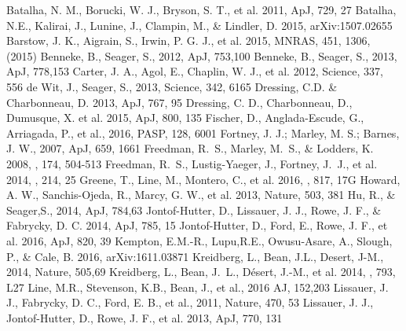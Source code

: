 \documentclass[iop]{emulateapj}
\begin{document}
\begin{thebibliography}{}
 Batalha, N. M., Borucki, W. J., Bryson, S. T., et al. 2011, ApJ, 729, 27
 Batalha, N.E., Kalirai, J., Lunine, J., Clampin, M., \& Lindler, D. 2015, arXiv:1507.02655
 Barstow, J. K., Aigrain, S., Irwin, P. G. J., et al. 2015, MNRAS, 451, 1306, (2015)
 Benneke, B., Seager, S., 2012, ApJ, 753,100
 Benneke, B., Seager, S., 2013, ApJ, 778,153
 Carter, J. A., Agol, E., Chaplin, W. J., et al. 2012, Science, 337, 556
 de Wit, J., Seager, S., 2013, Science, 342, 6165
 Dressing, C.D. \& Charbonneau, D. 2013, ApJ, 767, 95
 Dressing, C. D., Charbonneau, D., Dumusque, X. et al. 2015, ApJ, 800, 135
 Fischer, D., Anglada-Escude, G., Arriagada, P., et al., 2016, PASP, 128, 6001
 Fortney, J. J.; Marley, M. S.; Barnes, J. W., 2007, ApJ, 659, 1661
 Freedman, R.~S., Marley, M.~S., \& Lodders, K. 2008, \apjs, 174, 504-513  Freedman, R.~S., Lustig-Yaeger, J., Fortney, J.~J., et al. 2014, \apjs, 214, 25 
 Greene, T., Line, M., Montero, C., et al. 2016, \apj, 817, 17G 
Howard, A. W., Sanchis-Ojeda, R., Marcy, G. W., et al. 2013, Nature, 503, 381
 Hu, R., \& Seager,S., 2014, ApJ, 784,63
 Jontof-Hutter, D., Lissauer, J. J., Rowe, J. F., \& Fabrycky, D. C. 2014, ApJ, 785, 15
 Jontof-Hutter, D., Ford, E., Rowe, J. F., et al. 2016, ApJ, 820, 39
 Kempton, E.M.-R., Lupu,R.E., Owusu-Asare, A., Slough, P., \& Cale, B. 2016, arXiv:1611.03871
 Kreidberg, L., Bean, J.L., Desert, J-M., 2014, Nature, 505,69
 Kreidberg, L., Bean, J.~L., D{\'e}sert, J.-M., et al. 2014, \apjl, 793, L27 
 Line, M.R., Stevenson, K.B., Bean, J., et al., 2016 AJ, 152,203
 Lissauer, J. J., Fabrycky, D. C., Ford, E. B., et al., 2011, Nature, 470, 53
 Lissauer, J. J., Jontof-Hutter, D., Rowe, J. F., et al. 2013, ApJ, 770, 131

\end{thebibliography}
\end{document}
